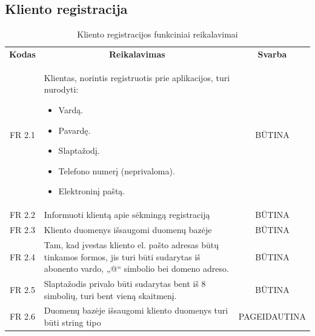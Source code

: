\documentclass{VUMIFPSkursinis}
\begin{document}
\subsection{Kliento registracija}
\begin{center}

	\begin{table}[H]
	\caption{Kliento registracijos funkciniai reikalavimai}
	\begin{tabular}{|p{2cm}|p{}|p{}|}
	\hline
	    \rowcolor{lightgray}
		\multicolumn{3}{|c|}{Kliento registracija}\\
		
	\hline
		\multicolumn{1}{|c|}{{\bfseries Kodas}}&
		\multicolumn{1}{|c|}{{\bfseries Reikalavimas}}&
		\multicolumn{1}{|c|}{{\bfseries Svarba}}\\

	\hline
	\multicolumn{1}{|c|}{FR 2.1}&
	{Klientas, norintis registruotis prie aplikacijos, turi nurodyti:
		\begin{itemize}
			\item Vardą.
			\item Pavardę.
			\item Slaptažodį.
			\item Telefono numerį (neprivaloma).
			\item Elektroninį paštą.
		\end{itemize}}&		
	\multicolumn{1}{|c|}{BŪTINA}\\
	\hline
	
		\multicolumn{1}{|c|}{FR 2.2}&
		{Informuoti klientą apie sėkmingą registraciją}&
		\multicolumn{1}{|c|}{BŪTINA}\\	
	\hline
		\multicolumn{1}{|c|}{FR 2.3}&
		{Kliento duomenys išsaugomi duomenų bazėje}&
		\multicolumn{1}{|c|}{BŪTINA}\\	
	\hline	
		\multicolumn{1}{|c|}{FR 2.4}&
		{Tam, kad įvestas kliento el. pašto adresas būtų tinkamos formos, jis turi būti sudarytas iš abonento vardo, „@“ simbolio bei domeno adreso.}&
		\multicolumn{1}{|c|}{BŪTINA}\\	
	\hline
		\multicolumn{1}{|c|}{FR 2.5}&
		{Slaptažodis privalo būti sudarytas bent iš 8 simbolių, turi bent vieną skaitmenį.
}&
		\multicolumn{1}{|c|}{BŪTINA}\\		
	\hline
		\multicolumn{1}{|c|}{FR 2.6}&
		{Duomenų bazėje išsaugomi kliento duomenys turi būti string tipo }&
		\multicolumn{1}{|p{1.5cm}|}{PAGEIDAUTINA}\\		
	\hline
	
	\end{tabular}
	
	\label{table:VartotojoRegistracija}
	\end{table}

\end{center}
\end{document}
